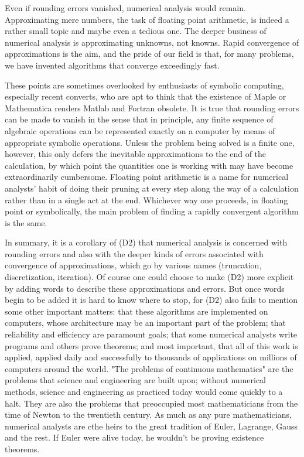 Even if rounding errors vanished, numerical analysis would remain. Approximating mere numbers, the task of floating point arithmetic, is indeed a rather small topic and maybe even a tedious one. The deeper business of numerical analysis is approximating unknowns, not knowns. Rapid convergence of approximations is the aim, and the pride of our field is that, for many problems, we have invented algorithms that converge exceedingly fast.

These points are sometimes overlooked by enthusiasts of symbolic computing, especially recent converts, who are apt to think that the existence of Maple or Mathematica renders Matlab and Fortran obsolete. It is true that rounding errors can be made to vanish in the sense that in principle, any finite sequence of algebraic operations can be represented exactly on a computer by means of appropriate symbolic operations. Unless the problem being solved is a finite one, however, this only defers the inevitable approximations to the end of the calculation, by which point the quantities one is working with may have become extraordinarily cumbersome. Floating point arithmetic is a name for numerical analysts' habit of doing their pruning at every step along the way of a calculation rather than in a single act at the end. Whichever way one proceeds, in floating point or symbolically, the main problem of finding a rapidly convergent algorithm is the same.

In summary, it is a corollary of (D2) that numerical analysis is concerned with rounding errors and also with the deeper kinds of errors associated with convergence of approximations, which go by various names (truncation, discretization, iteration). Of course one could choose to make (D2) more explicit by adding words to describe these approximations and errors. But once words begin to be added it is hard to know where to stop, for (D2) also fails to mention some other important matters: that these algorithms are implemented on computers, whose architecture may be an important part of the problem; that reliability and efficiency are paramount goals; that some numerical analysts write programs and others prove theorems; and most important, that all of this work is applied, applied daily and successfully to thousands of applications on millions of computers around the world. "The problems of continuous mathematics" are the problems that science and engineering are built upon; without numerical methods, science and engineering as practiced today would come quickly to a halt. They are also the problems that preoccupied most mathematicians from the time of Newton to the twentieth century. As much as any pure mathematicians, numerical analysts are cthe heirs to the great tradition of Euler, Lagrange, Gauss and the rest. If Euler were alive today, he wouldn't be proving existence theorems.

